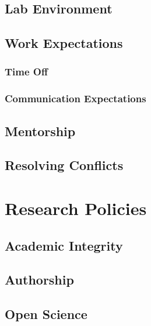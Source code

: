 \documentclass[
]{book}
\begin{document}
\hypertarget{lab-environment}{%
\section{Lab Environment}\label{lab-environment}}

\hypertarget{lab-work}{%
\section{Work Expectations}\label{lab-work}}

\hypertarget{lab-timeoff}{%
\subsection{Time Off}\label{lab-timeoff}}

\hypertarget{lab-communication}{%
\subsection{Communication Expectations}\label{lab-communication}}

\hypertarget{lab-mentorship}{%
\section{Mentorship}\label{lab-mentorship}}

\hypertarget{conflicts}{%
\section{Resolving Conflicts}\label{conflicts}}

\hypertarget{research-policies}{%
\chapter{Research Policies}\label{research-policies}}

\hypertarget{academic-integrity}{%
\section{Academic Integrity}\label{academic-integrity}}

\hypertarget{authorship}{%
\section{Authorship}\label{authorship}}

\hypertarget{open-science}{%
\section{Open Science}\label{open-science}}
\end{document}
